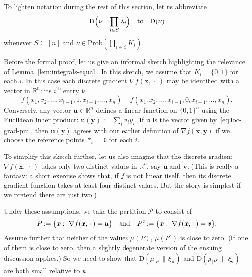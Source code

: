 \documentclass[aop,preprint]{imsart}
\theoremstyle{remark}
\renewcommand{\bf}[1]{\boldsymbol{#1}}
\renewcommand{\rm}[1]{\mathrm{#1}}
\renewcommand{\cal}[1]{\mathcal{#1}}
\newcommand{\bbR}{\mathbb{R}}
\renewcommand{\l}{\lambda}
\renewcommand{\Pr}{\rm{Prob}}
\newcommand{\rmD}{\mathrm{D}}
\begin{document}
To lighten notation during the rest of this section, let us abbreviate
\[\rmD\Big(\nu\,\Big\|\,\prod_{i \in S}\l_i\Big) \quad \hbox{to} \quad \rmD(\nu)\]
whenever $S \subseteq [n]$ and $\nu \in \Pr(\prod_{i\in S} K_i)$.

Before the formal proof, let us give an informal sketch highlighting the relevance of Lemma~\ref{lem:integrals-equal}.  In this sketch, we assume that $K_i = \{0,1\}$ for each $i$.  In this case each discrete gradient $\nabla f(\bf{x},\,\cdot\,)$ may be identified with a vector in $\bbR^n$: its $i^{\rm{th}}$ entry is
\begin{equation}\label{eq:loc-grad-pm}
f(x_1,x_2,\dots,x_{i-1},1,x_{i+1},\dots,x_n) - f(x_1,x_2,\dots,x_{i-1},0,x_{i+1},\dots,x_n).
\end{equation}
Conversely, any vector $\bf{u} \in \bbR^n$ defines a linear function on $\{0,1\}^n$ using the Euclidean inner product: $\bf{u}(\bf{y}) := \sum_i u_iy_i$. If $\bf{u}$ is the vector given by~\eqref{eq:loc-grad-pm}, then $\bf{u}(\bf{y})$ agrees with our earlier definition of $\nabla f(\bf{x},\bf{y})$ if we choose the reference points $\ast_i = 0$ for each $i$.

To simplify this sketch further, let us also imagine that the discrete gradient $\nabla f(\bf{x},\,\cdot\,)$ takes only two distinct values in $\bbR^n$, say $\bf{u}$ and $\bf{v}$. (This is really a fantasy: a short exercise shows that, if $f$ is not linear itself, then its discrete gradient function takes at least four distinct values.  But the story is simplest if we pretend there are just two.)

Under these assumptions, we take the partition $\cal{P}$ to consist of
\[P := \{\bf{x}:\ \nabla f(\bf{x},\,\cdot\,) = \bf{u}\} \quad \hbox{and}\quad P^\rm{c} := \{\bf{x}:\ \nabla f(\bf{x},\,\cdot\,) = \bf{v}\}.\]
Assume further that neither of the values $\mu(P)$, $\mu(P^\rm{c})$ is close to zero.  (If one of them is close to zero, then a slightly degenerate version of the ensuing discussion applies.)  So we need to show that $\rmD(\mu_{|P}\,\|\,\xi_{\bf{u}})$ and $\rmD(\mu_{|P^{\rm{c}}}\,\|\,\xi_{\bf{v}})$ are both small relative to $n$.
\end{document}

